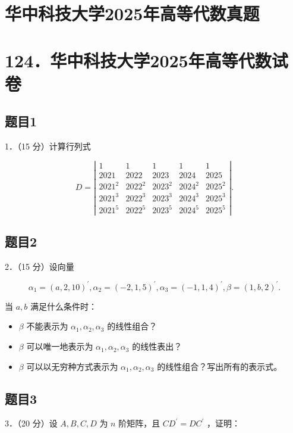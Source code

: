 \documentclass{article}
\begin{document}
\section*{华中科技大学2025年高等代数真题}
\section*{124．华中科技大学2025年高等代数试卷}

\subsection{题目1}
1．（15 分）计算行列式

\[
D=\left|\begin{array}{ccccc}
1 & 1 & 1 & 1 & 1 \\
2021 & 2022 & 2023 & 2024 & 2025 \\
2021^{2} & 2022^{2} & 2023^{2} & 2024^{2} & 2025^{2} \\
2021^{3} & 2022^{3} & 2023^{3} & 2024^{3} & 2025^{3} \\
2021^{5} & 2022^{5} & 2023^{5} & 2024^{5} & 2025^{5}
\end{array}\right| .
\]

\subsection{题目2}
2．（15 分）设向量

\[
\alpha_{1}=(a, 2,10)^{\prime}, \alpha_{2}=(-2,1,5)^{\prime}, \alpha_{3}=(-1,1,4)^{\prime}, \beta=(1, b, 2)^{\prime} .
\]

当 \(a, b\) 满足什么条件时：

\begin{itemize}
  \item[（1）] \(\beta\) 不能表示为 \(\alpha_{1}, \alpha_{2}, \alpha_{3}\) 的线性组合？
  \item[（2）] \(\beta\) 可以唯一地表示为 \(\alpha_{1}, \alpha_{2}, \alpha_{3}\) 的线性表出？
  \item[（3）] \(\beta\) 可以以无穷种方式表示为 \(\alpha_{1}, \alpha_{2}, \alpha_{3}\) 的线性组合？写出所有的表示式。
\end{itemize}

\subsection{题目3}
3．（20 分）设 \(A, B, C, D\) 为 \(n\) 阶矩阵，且 \(C D^{\prime}=D C^{\prime}\) ，证明：
\end{document}
